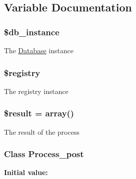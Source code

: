\subsection{Variable Documentation}
\hypertarget{process__post_8php_a79155f00a64b1dc5e717f64f53eb52a5}{
\subsubsection[{\$db\-\_\-instance}]{\setlength{\rightskip}{0pt plus 5cm}\$db\-\_\-instance}}\label{process__post_8php_a79155f00a64b1dc5e717f64f53eb52a5}
The \hyperlink{classDatabase}{Database} instance \hypertarget{process__post_8php_a531e4a386aaa7f3e06d3642dc38d7e80}{
\subsubsection[{\$registry}]{\setlength{\rightskip}{0pt plus 5cm}\$registry}}\label{process__post_8php_a531e4a386aaa7f3e06d3642dc38d7e80}
The registry instance \hypertarget{process__post_8php_a112ef069ddc0454086e3d1e6d8d55d07}{
\subsubsection[{\$result}]{\setlength{\rightskip}{0pt plus 5cm}\$result = array()}}\label{process__post_8php_a112ef069ddc0454086e3d1e6d8d55d07}
The result of the process \hypertarget{process__post_8php_a4d6a7c0044f859bfec6c54966529e7d9}{
\subsubsection[{Process\-\_\-post}]{\setlength{\rightskip}{0pt plus 5cm}Class {\bf Process\-\_\-post}}}\label{process__post_8php_a4d6a7c0044f859bfec6c54966529e7d9}
{\bfseries Initial value\-:}
